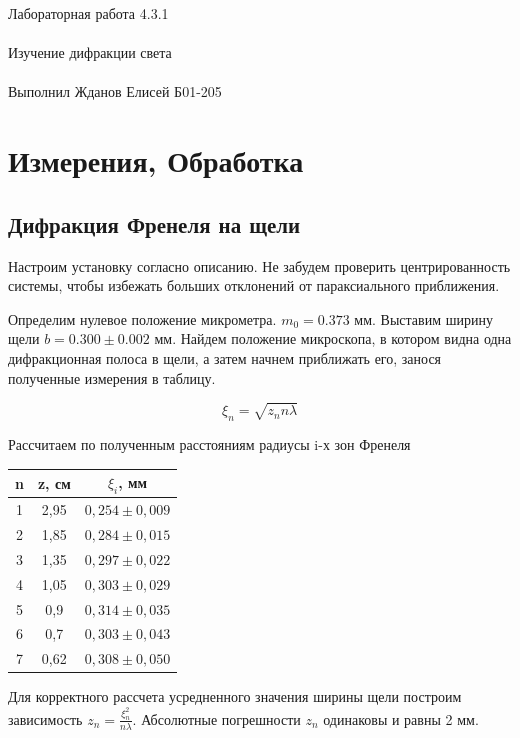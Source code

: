 \documentclass{astroedu-lab}
\begin{document}
\begin{problem}{\huge Лабораторная работа 4.3.1\\\\Изучение дифракции света\\\\Выполнил Жданов Елисей Б01-205}
\section{Измерения, Обработка}

\subsection{Дифракция Френеля на щели}

Настроим установку согласно описанию. Не забудем проверить центрированность системы, чтобы избежать больших отклонений от параксиального приближения.

Определим нулевое положение микрометра. $m_0 = 0.373$ мм. Выставим ширину щели $b = 0.300 \pm 0.002$ мм. Найдем положение микроскопа, в котором видна одна дифракционная полоса в щели, а затем начнем приближать его, занося полученные измерения в таблицу.

\begin{equation}
	\xi_n = \sqrt{z_n n \lambda}
\end{equation}

Рассчитаем по полученным расстояниям радиусы i-х зон Френеля

\begin{center}
\begin{tabular}{|c|c|c|}
\hline 
n & z, см & $\xi_i$, мм \\
\hline
1&	2,95&	$0,254\pm	0,009$ \\
2&	1,85&	$0,284\pm	0,015$ \\
3&	1,35&	$0,297\pm	0,022$ \\
4&	1,05&	$0,303\pm	0,029$ \\
5&	0,9	&	$0,314\pm	0,035$ \\
6&	0,7	&	$0,303\pm	0,043$ \\
7&	0,62&	$0,308\pm	0,050$ \\
\hline
\end{tabular}
\end{center}

Для корректного рассчета усредненного значения ширины щели построим зависимость $z_n = \frac{\xi_n^2}{n \lambda}$. Абсолютные погрешности $z_n$ одинаковы и равны 2 мм.


\end{problem}
\end{document}
